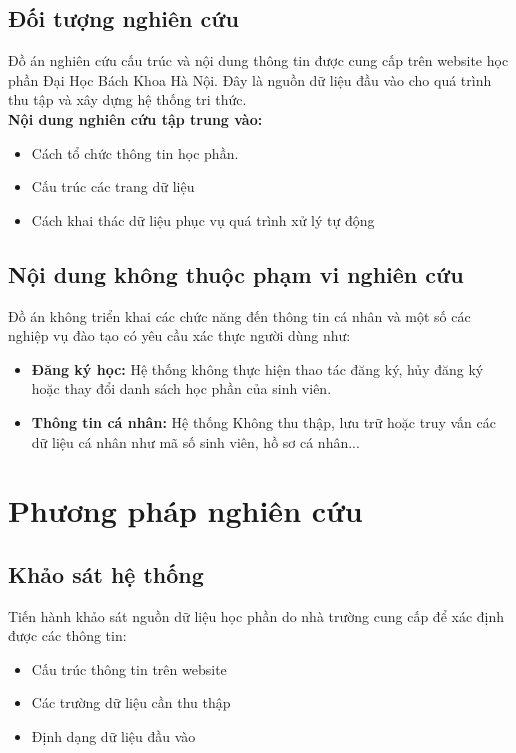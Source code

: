 \documentclass[../DoAn.tex]{subfiles}
\begin{document}
\subsection{Đối tượng nghiên cứu}
Đồ án nghiên cứu cấu trúc và nội dung thông tin được cung cấp trên website học phần Đại Học Bách Khoa Hà Nội. Đây là nguồn dữ liệu đầu vào cho quá trình thu tập và xây dựng hệ thống tri thức.\\ 
\textbf{Nội dung nghiên cứu tập trung vào:}
\begin{itemize}
    \item Cách tổ chức thông tin học phần.
    \item Cấu trúc các trang dữ liệu
    \item Cách khai thác dữ liệu phục vụ quá trình xử lý tự động
\end{itemize}

\subsection{Nội dung không thuộc phạm vi nghiên cứu}
Đồ án không triển khai các chức năng đến thông tin cá nhân và một số các nghiệp vụ đào tạo có yêu cầu xác thực người dùng như:
\begin{itemize}
    \item \textbf{Đăng ký học:} Hệ thống không thực hiện thao tác đăng ký, hủy đăng ký hoặc thay đổi danh sách học phần của sinh viên.
    \item  \textbf{Thông tin cá nhân:} Hệ thống Không thu thập, lưu trữ hoặc truy vấn các dữ liệu cá nhân như mã số sinh viên, hồ sơ cá nhân...
\end{itemize}


\section{Phương pháp nghiên cứu}
\subsection{Khảo sát hệ thống}
Tiến hành khảo sát nguồn dữ liệu học phần do nhà trường cung cấp để xác định được các thông tin:
\begin{itemize}
    \item Cấu trúc thông tin trên website
    \item Các trường dữ liệu cần thu thập
    \item Định dạng dữ liệu đầu vào
\end{itemize}
\end{document}
